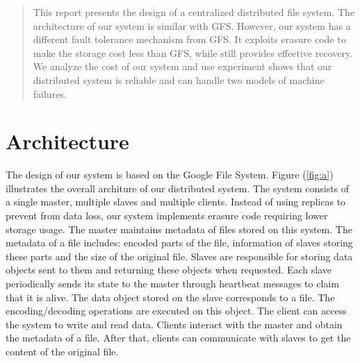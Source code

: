 \documentclass[conference]{IEEEtran}
\begin{document}
\begin{abstract}
\boldmath
This report presents the design of a centralized distributed file system. The architecture of our system is similar with GFS\cite{gfs}. However, our system has a different fault tolerance mechanism from GFS. It exploits erasure code to make the  storage cost less than GFS, while still provides effective recovery. We analyze the cost of our system and use experiment shows that our distributed system is reliable and can handle two models of machine failures.
\end{abstract}





%
\IEEEpeerreviewmaketitle

\section{Architecture}
The design of our system is based on the Google File System\cite{gfs}. Figure (\ref{fig:a}) illustrates the overall architure of our distributed system.
The system consists of a single master, multiple slaves and  multiple clients. Instead of using replicas to prevent from data loss, our system implements erasure code requiring lower storage usage. The master maintains metadata of files stored on this system. The metadata of a file includes: encoded parts of the file, information of slaves storing these parts and the size of the original file. Slaves are responsible for storing data objects sent to them and returning these objects when requested. Each slave periodically sends its state to the master through heartbeat messages to claim that it is alive. The data object stored on the slave corresponds to a file. The encoding/decoding operations are executed on this object. The client can access the system to write and read data.
Clients interact with the master and obtain the metadata of a file. After that, clients can communicate with slaves to get the content of the original file.
\end{document}
